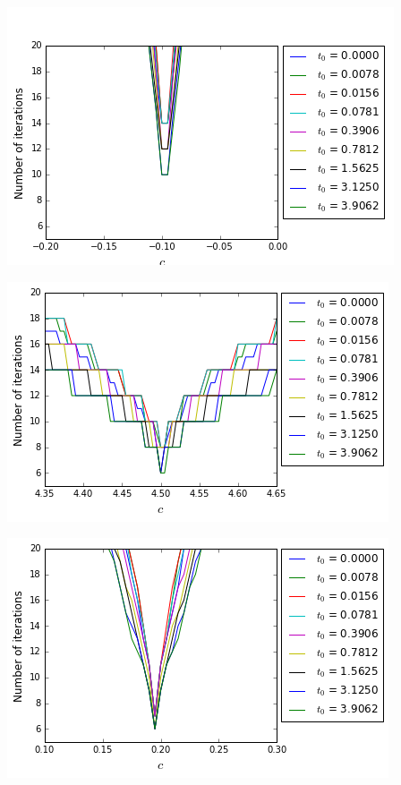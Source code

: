 \begin{minipage}{.5\linewidth}
\begin{center}
	\includegraphics[scale=.4]{figures/FinalFigures/NiterxCoefVarT0FinalVersionNDetail2.png}
\end{center}
\end{minipage}
\begin{minipage}{.5\linewidth}
\begin{center}
	\includegraphics[scale=.4]{figures/FinalFigures/NiterxCoefVarT0FinalVersionPDetail.png}
\end{center}
\end{minipage}
\begin{minipage}{.5\linewidth}
\begin{center}
	\includegraphics[scale=.4]{figures/FinalFigures/NiterxCoefVarT0FinalVersionPDetail2.png}
\end{center}
\end{minipage}
